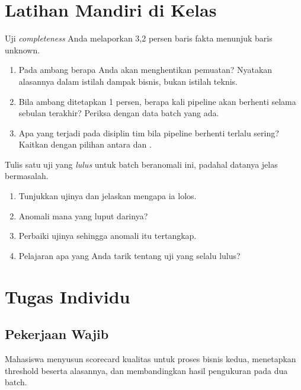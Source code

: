 \section{Latihan Mandiri di Kelas}


Uji \emph{completeness} Anda melaporkan 3,2 persen baris fakta menunjuk baris
unknown.

\begin{enumerate}[leftmargin=1.4em]
  \item Pada ambang berapa Anda akan menghentikan pemuatan? Nyatakan alasannya
        dalam istilah dampak bisnis, bukan istilah teknis.
  \item Bila ambang ditetapkan 1 persen, berapa kali pipeline akan berhenti
        selama sebulan terakhir? Periksa dengan data batch yang ada.
  \item Apa yang terjadi pada disiplin tim bila pipeline berhenti terlalu
        sering? Kaitkan dengan pilihan antara  dan
        .
\end{enumerate}


Tulis satu uji yang \emph{lulus} untuk batch beranomali ini, padahal datanya
jelas bermasalah.

\begin{enumerate}[leftmargin=1.4em]
  \item Tunjukkan ujinya dan jelaskan mengapa ia lolos.
  \item Anomali mana yang luput darinya?
  \item Perbaiki ujinya sehingga anomali itu tertangkap.
  \item Pelajaran apa yang Anda tarik tentang uji yang selalu lulus?
\end{enumerate}

\section{Tugas Individu}

\subsection{Pekerjaan Wajib}

Mahasiswa menyusun scorecard kualitas untuk proses bisnis kedua, menetapkan
threshold beserta alasannya, dan membandingkan hasil pengukuran pada dua batch.

